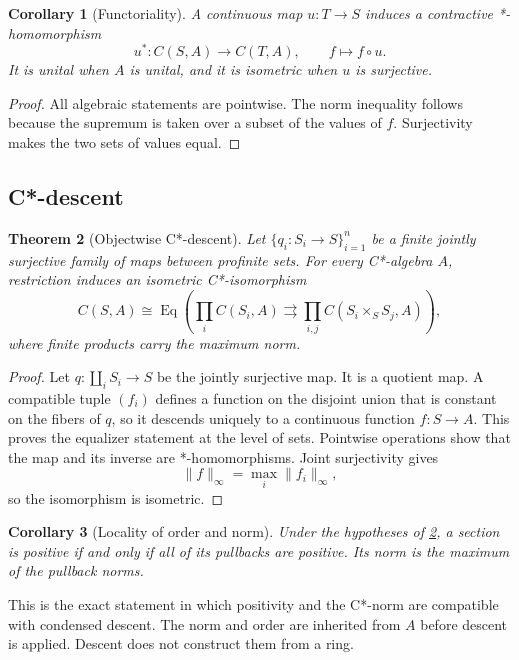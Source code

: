 \documentclass[12pt]{article}
\newtheorem{theorem}{Theorem}[section]
\newtheorem{corollary}[theorem]{Corollary}
\theoremstyle{definition}
\theoremstyle{remark}
\newcommand{\Eq}{\operatorname{Eq}}
\begin{document}
\begin{corollary}[Functoriality]
A continuous map $u:T\to S$ induces a contractive *-homomorphism
\[
u^*:C(S,A)\longrightarrow C(T,A),\qquad f\longmapsto f\circ u.
\]
It is unital when $A$ is unital, and it is isometric when $u$ is surjective.
\end{corollary}

\begin{proof}
All algebraic statements are pointwise.  The norm inequality follows because the
supremum is taken over a subset of the values of $f$.  Surjectivity makes the two
sets of values equal.
\end{proof}

\subsection{C*-descent}

\begin{theorem}[Objectwise C*-descent]\label{thm:descent}
Let $\{q_i:S_i\to S\}_{i=1}^n$ be a finite jointly surjective family of maps between
profinite sets.  For every C*-algebra $A$, restriction induces an isometric
C*-isomorphism
\[
C(S,A)
\cong
\Eq\left(
\prod_i C(S_i,A)
\rightrightarrows
\prod_{i,j}C(S_i\times_S S_j,A)
\right),
\]
where finite products carry the maximum norm.
\end{theorem}

\begin{proof}
Let $q:\coprod_iS_i\to S$ be the jointly surjective map.  It is a quotient map.  A
compatible tuple $(f_i)$ defines a function on the disjoint union that is constant
on the fibers of $q$, so it descends uniquely to a continuous function $f:S\to A$.
This proves the equalizer statement at the level of sets.  Pointwise operations show
that the map and its inverse are *-homomorphisms.  Joint surjectivity gives
\[
\|f\|_\infty=\max_i\|f_i\|_\infty,
\]
so the isomorphism is isometric.
\end{proof}

\begin{corollary}[Locality of order and norm]
Under the hypotheses of \cref{thm:descent}, a section is positive if and only if all
of its pullbacks are positive.  Its norm is the maximum of the pullback norms.
\end{corollary}

This is the exact statement in which positivity and the C*-norm are compatible with
condensed descent.  The norm and order are inherited from $A$ before descent is
applied.  Descent does not construct them from a ring.
\end{document}
